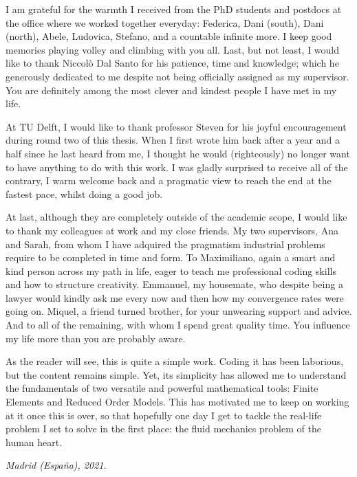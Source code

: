 \documentclass[thesis.tex]{subfiles}
\begin{document}
I am grateful for the warmth I received from the PhD students and postdocs at the office where we worked together everyday: Federica, Dani (south), Dani (north), Abele, Ludovica, Stefano, and a countable infinite more.
I keep good memories playing volley and climbing with you all.
Last, but not least, I would like to thank Niccolò Dal Santo for his patience, time and knowledge; which he generously dedicated to me despite not being officially assigned as my supervisor. 
You are definitely among the most clever and kindest people I have met in my life.

At TU Delft, I would like to thank professor Steven for his joyful encouragement during round two of this thesis.
When I first wrote him back after a year and a half since he last heard from me, I thought he would (righteously) no longer want to have anything to do with this work.
I was gladly surprised to receive all of the contrary, I warm welcome back and a pragmatic view to reach the end at the fastest pace, whilst doing a good job. 

At last, although they are completely outside of the academic scope, I would like to thank my colleagues at work and my close friends.
My two supervisors, Ana and Sarah, from whom I have adquired the pragmatism industrial problems require to be completed in time and form.
To Maximiliano, again a smart and kind person across my path in life, eager to teach me professional coding skills and how to structure creativity.
Emmanuel, my housemate, who despite being a lawyer would kindly ask me every now and then how my convergence rates were going on.
Miquel, a friend turned brother, for your unwearing support and advice.
And to all of the remaining, with whom I spend great quality time.
You influence my life more than you are probably aware.

As the reader will see, this is quite a simple work.
Coding it has been laborious, but the content remains simple.
Yet, its simplicity has allowed me to understand the fundamentals of 
two versatile and powerful mathematical tools: Finite Elements and Reduced Order Models.
This has motivated me to keep on working at it once this is over, 
so that hopefully one day I get to tackle the real-life problem I set to solve in the first place: 
the fluid mechanics problem of the human heart.

\begin{flushright}
    \vspace{5mm}
    \textit{Madrid (España), 2021.}    
\end{flushright}
\end{document}

